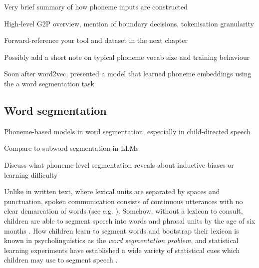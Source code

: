 


Very brief summary of how phoneme inputs are constructed

High-level G2P overview, mention of boundary decisions, tokenisation granularity

Forward-reference your tool and dataset in the next chapter

Possibly add a short note on typical phoneme vocab size and training behaviour


Soon after word2vec, \citet{ma2016learning} presented a model that learned phoneme embeddings using the  a word segmentation task

\subsection{Word segmentation}

Phoneme-based models in word segmentation, especially in child-directed speech

Compare to subword segmentation in LLMs

Discuss what phoneme-level segmentation reveals about inductive biases or learning difficulty

Unlike in written text, where lexical units are separated by spaces and punctuation, spoken communication consists of continuous utterances with no clear demarcation of words (see e.g. \citet{cole1980model}). Somehow, without a lexicon to consult, children are able to segment speech into words and phrasal units by the age of six months \citep{Jusczyk1999infants}. How children learn to segment words and bootstrap their lexicon is known in psycholinguistics as the \emph{word segmentation problem}, and statistical learning experiments have established a wide variety of statistical cues which children may use to segment speech \citep{Cutler1987, gleitman1988learning, Jusczyk1993stress, Saffran1996distributional, Jusczyk1999allophonic, Suomi1997}.


